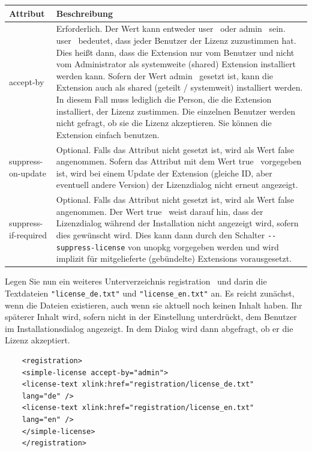 \documentclass[12pt,a4paper,titlepage]{book}
\begin{document}
\begin{tabular}{|p{4cm}|p{7.8cm}|}
	\hline \rowcolor{hellgrau} \rule[-3ex]{0pt}{5.5ex}  Attribut & Beschreibung \\
	\hline \rule[-3ex]{0pt}{5.5ex} accept-by & Erforderlich. Der Wert kann entweder \glqq user\grqq~ oder \glqq admin\grqq~ sein. \glqq user\grqq~ bedeutet, dass jeder Benutzer der Lizenz zuzustimmen hat. Dies heißt dann, dass die Extension nur vom Benutzer und nicht vom Administrator als systemweite (shared) Extension installiert werden kann. Sofern der Wert \glqq admin\grqq~ gesetzt ist, kann die Extension auch als shared (geteilt / systemweit) installiert werden. In diesem Fall muss lediglich die Person, die die Extension installiert, der Lizenz zustimmen. Die einzelnen Benutzer werden nicht gefragt, ob sie die Lizenz akzeptieren. Sie können die Extension einfach benutzen.\\
	\hline \rule[-3ex]{0pt}{5.5ex}	suppress-on-update & Optional. Falls das Attribut nicht gesetzt ist, wird als Wert \glqq false\grqq~ angenommen. Sofern das Attribut mit dem Wert \glqq true\grqq~ vorgegeben ist, wird bei einem Update der Extension (gleiche ID, aber eventuell andere Version) der Lizenzdialog nicht erneut angezeigt.\\
	\hline \rule[-3ex]{0pt}{5.5ex}	suppress-if-required & Optional. Falls das Attribut nicht gesetzt ist, wird als Wert \glqq false\grqq~ angenommen. Der Wert \glqq true\grqq~ weist darauf hin, dass der Lizenzdialog während der Installation nicht angezeigt wird, sofern dies gewünscht wird. Dies kann dann durch den Schalter  \verb|--suppress-license| von unopkg vorgegeben werden und wird implizit für mitgelieferte (gebündelte) Extensions vorausgesetzt.\\
	\bottomrule
	
\end{tabular}

\bigskip
\bigskip
Legen Sie nun ein weiteres Unterverzeichnis \glqq registration\grqq~ und darin die Textdateien \verb|"license_de.txt"| und \verb|"license_en.txt"| an. Es reicht zunächst, wenn die Dateien existieren, auch wenn sie aktuell noch keinen Inhalt haben. Ihr späterer Inhalt wird, sofern nicht in der Einstellung unterdrückt, dem Benutzer im Installationsdialog angezeigt. In dem Dialog wird dann abgefragt, ob er die Lizenz akzeptiert.

\begin{lstlisting}
	<registration>
	<simple-license accept-by="admin">
	<license-text xlink:href="registration/license_de.txt" 
	lang="de" />
	<license-text xlink:href="registration/license_en.txt" 
	lang="en" />
	</simple-license>
	</registration>
\end{lstlisting}
\end{document}
